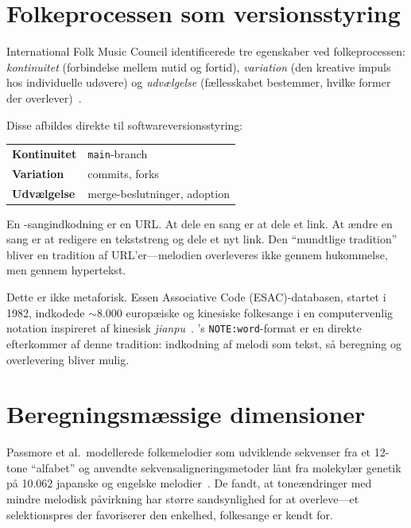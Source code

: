 \documentclass[11pt]{article}
\begin{document}
\section{Folkeprocessen som versionsstyring}

International Folk Music Council identificerede tre egenskaber ved folkeprocessen: \emph{kontinuitet} (forbindelse mellem nutid og fortid), \emph{variation} (den kreative impuls hos individuelle udøvere) og \emph{udvælgelse} (fællesskabet bestemmer, hvilke former der overlever)~\citep{karpeles1955definition}.

\begin{accentcard}
Disse afbildes direkte til softwareversionsstyring:

\vspace{0.3em}
\begin{tabularx}{\linewidth}{lX}
\textbf{Kontinuitet} & \texttt{main}-branch \\
\textbf{Variation} & commits, forks \\
\textbf{Udvælgelse} & merge-beslutninger, adoption \\
\end{tabularx}
\end{accentcard}

En \np{}-sangindkodning er en URL. At dele en sang er at dele et link. At ændre en sang er at redigere en tekststreng og dele et nyt link. Den ``mundtlige tradition'' bliver en tradition af URL'er---melodien overleveres ikke gennem hukommelse, men gennem hypertekst.

Dette er ikke metaforisk. Essen Associative Code (ESAC)-databasen, startet i 1982, indkodede $\sim$8.000 europæiske og kinesiske folkesange i en computervenlig notation inspireret af kinesisk \textit{jianpu}~\citep{schaffrath1995esac}. \np{}'s \texttt{NOTE:word}-format er en direkte efterkommer af denne tradition: indkodning af melodi som tekst, så beregning og overlevering bliver mulig.

\section{Beregningsmæssige dimensioner}

Passmore et al.\ modellerede folkemelodier som udviklende sekvenser fra et 12-tone ``alfabet'' og anvendte sekvensaligneringsmetoder lånt fra molekylær genetik på 10.062 japanske og engelske melodier~\citep{passmore2023cultural}. De fandt, at toneændringer med mindre melodisk påvirkning har større sandsynlighed for at overleve---et selektionspres der favoriserer den enkelhed, folkesange er kendt for.
\end{document}
